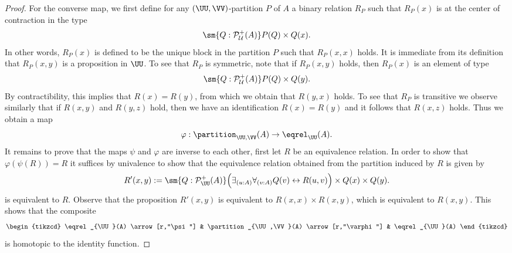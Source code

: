 \begin{proof}
  For the converse map, we first define for any $(\UU,\VV)$-partition $P$ of $A$ a binary relation $R_P$ such that $R_P(x)$ is at the center of contraction in the type
  \begin{equation*}
    \sm{Q:\mathcal{P}^+_{\mathcal{U}}(A)}P(Q)\times Q(x).
  \end{equation*}
  In other words, $R_P(x)$ is defined to be the unique block in the partition $P$ such that $R_P(x,x)$ holds. It is immediate from its definition that $R_P(x,y)$ is a proposition in $\UU$. To see that $R_P$ is symmetric, note that if $R_P(x,y)$ holds, then $R_P(x)$ is an element of type
  \begin{equation*}
    \sm{Q:\mathcal{P}^+_{\mathcal{U}}(A)}P(Q)\times Q(y).
  \end{equation*}
  By contractibility, this implies that $R(x)=R(y)$, from which we obtain that $R(y,x)$ holds. To see that $R_P$ is transitive we observe similarly that if $R(x,y)$ and $R(y,z)$ hold, then we have an identification $R(x)=R(y)$ and it follows that $R(x,z)$ holds.  Thus we obtain a map
  \begin{equation*}
    \varphi:\partition_{\UU,\VV}(A)\to\eqrel_{\UU}(A).
  \end{equation*}
  It remains to prove that the maps $\psi$ and $\varphi$ are inverse to each other, first let $R$ be an equivalence relation. In order to show that $\varphi(\psi(R))=R$ it suffices by univalence to show that the equivalence relation obtained from the partition induced by $R$ is given by
  \begin{equation*}
    R'(x,y):=\sm{Q:\mathcal{P}_{\UU}^+(A)}\Big(\exists_{(u:A)}\forall_{(v:A)}Q(v)\leftrightarrow R(u,v)\Big)\times Q(x)\times Q(y).
  \end{equation*}
  is equivalent to $R$. Observe that the proposition $R'(x,y)$ is equivalent to $R(x,x)\times R(x,y)$, which is equivalent to $R(x,y)$. This shows that the composite
  \begin{equation*}
    \begin{tikzcd}
      \eqrel_{\UU}(A) \arrow[r,"\psi"] & \partition_{\UU,\VV}(A) \arrow[r,"\varphi"] & \eqrel_{\UU}(A)
    \end{tikzcd}
  \end{equation*}
  is homotopic to the identity function.


\end{proof}
